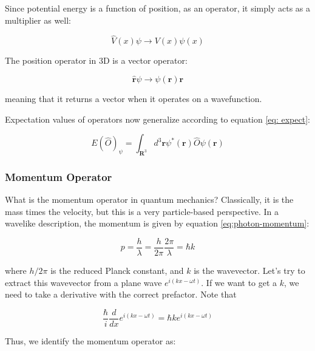 Since potential energy is a function of position, as an operator, it simply acts as a multiplier as well:

\begin{equation}
	\hat{V}(x)\psi \to V(x)\psi(x)
\end{equation}

The position operator in 3D is a vector operator:

\begin{equation}
	\hat{\mathbf{r}} \psi \to \psi(\mathbf{r})\mathbf{r}
\end{equation}

meaning that it returns a vector when it operates on a wavefunction. 

Expectation values of operators now generalize according to equation \ref{eq: expect}:

\begin{equation}
	\boxed{E(\hat{O})_{\psi} = \int_{\mathbf{R}^3} d^3\mathbf{r} \psi^*(\mathbf{r}) \hat{O}\psi(\mathbf{r})}
\end{equation}

\subsubsection{Momentum Operator}

What is the momentum operator in quantum mechanics? Classically, it is the mass times the velocity, but this is a very particle-based perspective. In a wavelike description, the momentum is given by equation \ref{eq:photon-momentum}:

\begin{equation}
	p = \frac{h}{\lambda} = \frac{h}{2\pi}\frac{2\pi}{\lambda} = \hbar k
\end{equation}

where $h/2\pi$ is the reduced Planck constant, and $k$ is the wavevector. Let's try to extract this wavevector from a plane wave $ e^{i(kx -\omega t)} $. If we want to get a $k$, we need to take a derivative with the correct prefactor. Note that

\begin{equation}
	\frac{\hbar}{i} \frac{d}{dx}e^{i(kx - \omega t)} = \hbar k e^{i(kx - \omega t)}
\end{equation}

Thus, we identify the momentum operator as:


